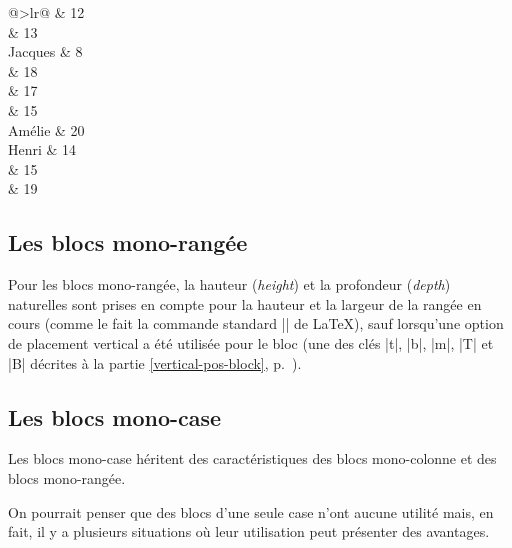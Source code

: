 \documentclass[dvipsnames]{article}
\begin{document}
\medskip
\begin{Code}[width=12cm,show-output]
\begin{NiceTabular}{@{}>{\color{blue}}lr@{}} \hline
{}    & 12 \\
                       & 13 \\ \hline
Jacques                &  8 \\ \hline
{} & 18 \\
                       & 17 \\
                       & 15 \\ \hline
Amélie                 & 20 \\ \hline
Henri                  & 14 \\ \hline
{}   & 15 \\
                       & 19 \\ \hline
\end{NiceTabular}
\end{Code}



\subsection{Les blocs mono-rangée}

Pour les blocs mono-rangée, la hauteur (\emph{height}) et la profondeur
(\emph{depth}) naturelles sont prises en compte pour la hauteur et la largeur de
la rangée en cours (comme le fait la commande standard |\multicolumn| de LaTeX),
sauf lorsqu'une option de placement vertical a été utilisée pour le bloc (une
des clés |t|, |b|, |m|, |T| et |B| décrites à la partie
\ref{vertical-pos-block}, p.~\pageref{vertical-pos-block}). 


\subsection{Les blocs mono-case}

Les blocs mono-case héritent des caractéristiques des blocs mono-colonne et
des blocs mono-rangée.

\medskip
On pourrait penser que des blocs d'une seule case n'ont aucune utilité mais, en
fait, il y a plusieurs situations où leur utilisation peut présenter des avantages.
\end{document}
